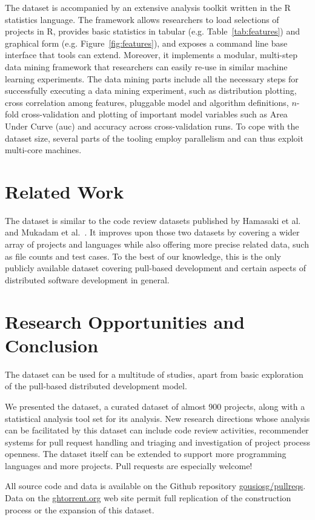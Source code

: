 \documentclass{sig-alternate}
\begin{document}
The \pullreqs dataset is accompanied by an extensive analysis toolkit written in
the R statistics language. The framework allows researchers to load selections
of projects in R, provides basic statistics in tabular (e.g.
Table~\ref{tab:features}) and graphical form (e.g. Figure~\ref{fig:features}),
and exposes a command line base interface that tools can extend. Moreover,
it implements a modular, multi-step data mining framework that researchers
can easily re-use in similar machine learning experiments. The data mining
parts include all the necessary steps for successfully executing a data mining
experiment, such as distribution plotting, cross correlation among features,
pluggable model and algorithm definitions, $n$-fold cross-validation and
plotting of important model variables such as Area Under Curve ({\sc auc}) and
accuracy across cross-validation runs. To cope with the \pullreqs dataset
size, several parts of the tooling employ parallelism and can thus exploit
multi-core machines.

\section{Related Work}
\label{sec:rel}

The \pullreqs dataset is similar to the code review datasets published by
Hamasaki et al.~\cite{Hamas13} and Mukadam et al.~\cite{Mukad13}.  It improves
upon those two datasets by covering a wider array of projects and languages
while also offering more precise related data, such as file counts and test
cases. To the best of our knowledge, this is the only publicly available
dataset covering pull-based development and certain aspects of distributed
software development in general.

\section{Research Opportunities and Conclusion}

The \pullreqs dataset can be used for a multitude of studies, apart from
basic exploration of the pull-based distributed development model.

We presented the \pullreqs dataset, a curated dataset of almost 900 projects,
along with a statistical analysis tool set for its analysis. New research directions whose analysis can be facilitated
by this dataset can include code review activities, recommender systems for pull
request handling and triaging and investigation of project process openness. The
dataset itself can be extended to support more programming languages and more
projects. Pull requests are especially welcome!

All source code and data is available on the Github repository
\href{https://github.com/gousiosg/pullreqs}{gousiosg/pullreqs}. Data on the
\href{http://ghtorrent.org}{ghtorrent.org} web site permit full replication
of the construction process or the expansion of this dataset.


\balance

  
\end{document}
